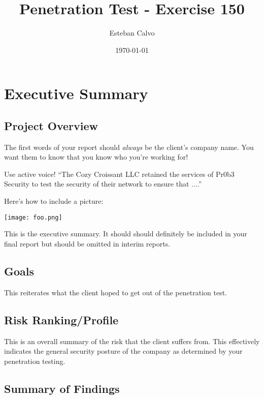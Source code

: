 \documentclass[notitlepage]{article}
\begin{document}
  
\title{Penetration Test - Exercise 150}
\author{Esteban Calvo}
\date{\isodate\today}

\maketitle

\tableofcontents

\newpage
\section{Executive Summary}



\subsection{Project Overview}
The first words of your report should \emph{always} be the client's company name.
You want them to know that you know who you're working for!

Use active voice!
``The Cozy Croissant LLC retained the services of Pr0b3 Security to test the security of their network to ensure that ....''

Here's how to include a picture:

\texttt{[image: foo.png]}

This is the executive summary.
It should should definitely be included in your final report but should be omitted in interim reports.


\subsection{Goals}

This reiterates what the client hoped to get out of the penetration
test.

\subsection{Risk Ranking/Profile}

This is an overall summary of the risk that the client suffers from. This effectively indicates the general security posture of the company as determined by your penetration testing.

\subsection{Summary of Findings}
\end{document}
